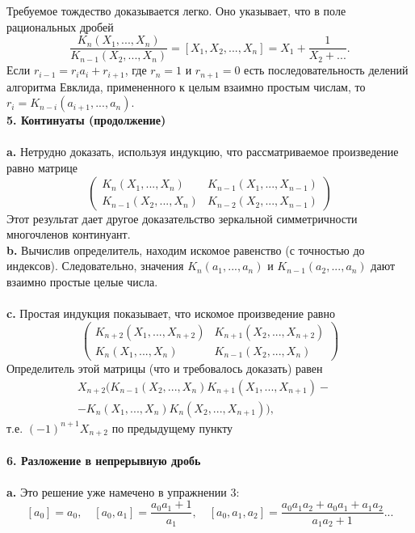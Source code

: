 \documentclass{mai_book}
\begin{document}
Требуемое тождество доказывается легко. Оно указывает, что в\linebreak
по­ле рациональных дробей
$$ \frac{K_n(X_1,...,X_n)}{K_{n-1}(X_2,...,X_n)}=[X_1,X_2,...,X_n]=X_1+\frac{1}{X_2+...}.$$
Если $r_{i-1}=r_ia_i+r_{i+1}$, где $r_n=1$ и $r_{n+1}=0$ есть последовательность\linebreak
делений алгоритма Евклида, примененного к целым взаимно простым\linebreak
числам, то $r_i=K_{n-i}(a_{i+1},...,a_n)$.\newline
\\
\noindent\textbf{5. Континуаты (продолжение)}\\
\\
\hspace*{15pt}\textbf{a.} Нетрудно доказать, используя индукцию, что рассматриваемое\linebreak
произведение равно матрице
$$\begin{pmatrix}
	K_n(X_1,...,X_n)& K_{n-	1}(X_1,...,X_{n-1})\\
	K_{n-1}(X_2,...,X_n)& K_{n-2}(X_2,...,X_{n-1})
\end{pmatrix}$$
\noindent Этот результат дает другое доказательство зеркальной симметричности\linebreak
многочленов континуант.\newline
\\
\hspace*{15pt}\textbf{b.} Вычислив определитель, находим искомое равенство (с точно­стью\linebreak
до индексов). Следовательно, значения $K_n(a_1,...,a_n)$ и\linebreak
$K_{n-1}(a_2,...,a_n)$ дают взаимно простые целые числа.\\
\\
\hspace*{15pt}\textbf{c.} Простая индукция показывает, что искомое произведение равно
$$\begin{pmatrix}
	K_{n+2}(X_1,...,X_{n+2})& K_{n+1}(X_2,...,X_{n+2})\\
	K_n(X_1,...,X_n)& K_{n-1}(X_2,...,X_n)
\end{pmatrix}$$
\noindent Определитель этой матрицы (что и требовалось доказать) равен
\begin{eqnarray*}
	X_{n+2}\Big( K_{n-1}(X_2,...,X_n) K_{n+1}(X_1,...,X_{n+1})-\quad\\
	-K_n(X_1,...,X_n)K_n(X_2,...,X_{n+1}) \Big),
\end{eqnarray*}
т.е.\:\: $(-1)^{n+1}X_{n+2}$\:\: по предыдущему пункту\\
\\
\noindent\textbf{6. Разложение в непрерывную дробь}\\
\\
\hspace*{15pt}\textbf{a.} Это решение уже намечено в упражнении 3:
$$[a_0]=a_0,\quad [a_0,a_1]=\frac{a_0a_1+1}{a_1},\quad [a_0,a_1,a_2]=\frac{a_0a_1a_2+a_0a_1+a_1a_2}{a_1a_2+1}...$$
\newpage
\end{document}
